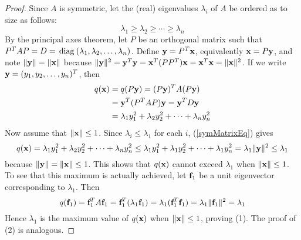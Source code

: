 \begin{proof}
Since $A$ is symmetric, let the (real) eigenvalues $\lambda_{i}$ of $A$ be ordered as to size as follows: 
\begin{equation*}
\lambda_{1} \geq \lambda_{2} \geq \cdots \geq \lambda_{n}
\end{equation*}
By the principal axes theorem, let $P$ be an orthogonal matrix such that $P^{T}AP = D = \thinspace\operatorname{diag\medspace}(\lambda_{1}, \lambda_{2}, \dots, \lambda_{n})$. Define $\textbf{y} = P^{T}\textbf{x}$, equivalently $\textbf{x} = P\textbf{y}$, and note $\|\textbf{y}\| = \|\textbf{x}\|$ because $\|\textbf{y}\|^{2} = \textbf{y}^{T}\textbf{y} = \textbf{x}^{T}(PP^{T})\textbf{x} = \textbf{x}^{T}\textbf{x} = \|\textbf{x}\|^{2}$. If we write $\textbf{y} = (y_{1}, y_{2}, \dots, y_{n})^{T}$, then
\begin{align} \label{symMatrixEq}
q(\textbf{x}) &= q(P\textbf{y}) = (P\textbf{y})^TA(P\textbf{y}) \nonumber \\ 
			&= \textbf{y}^T(P^TAP)\textbf{y} = \textbf{y}^TD\textbf{y} \nonumber \\
			&= \lambda_{1}y_{1}^2 + \lambda_{2}y_{2}^2 + \cdots + \lambda_{n}y_{n}^2
\end{align}
Now assume that $\|\textbf{x}\| \leq 1$. Since $\lambda_{i} \leq \lambda_{1}$ for each $i$, (\ref{symMatrixEq}) gives
\begin{equation*}
q(\textbf{x}) = \lambda_{1}y_{1}^2 + \lambda_{2}y_{2}^2 + \cdots + \lambda_{n}y_{n}^2 \leq \lambda_{1}y_{1}^2 + \lambda_{1}y_{2}^2 + \cdots + \lambda_{1}y_{n}^2 = \lambda_{1} \| \textbf{y} \|^2 \leq \lambda_{1}
\end{equation*}
because $\|\textbf{y}\| = \|\textbf{x}\| \leq 1$. This shows that $q(\textbf{x})$ cannot exceed $\lambda_{1}$ when $\|\textbf{x}\| \leq 1$. To see that this maximum is actually achieved, let $\textbf{f}_{1}$ be a unit eigenvector corresponding to $\lambda_{1}$. Then
\begin{equation*}
q(\textbf{f}_{1}) = \textbf{f}_{1}^TA\textbf{f}_{1} = \textbf{f}_{1}^T(\lambda_{1}\textbf{f}_{1}) = \lambda_{1}(\textbf{f}_{1}^T\textbf{f}_{1}) = \lambda_{1} \| \textbf{f}_{1} \|^2 = \lambda_{1}
\end{equation*}
Hence $\lambda_{1}$ is the maximum value of $q(\textbf{x})$ when $\|\textbf{x}\| \leq 1$, proving (1). The proof of (2) is analogous.
\end{proof}

